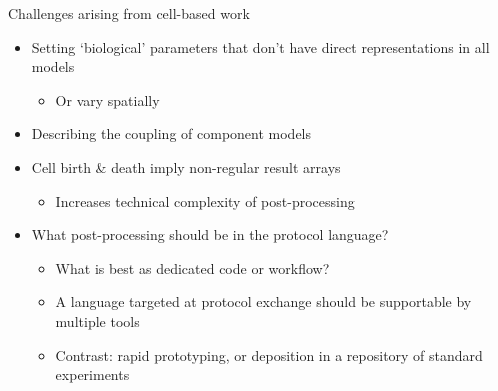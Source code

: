 \documentclass[t,xcolor={usenames,dvipsnames}]{beamer}
\newcommand{\subitem}[1]{\begin{itemize}[<.->]\item #1 \end{itemize}}
\begin{document}
\begin{frame}{Challenges arising from cell-based work}
\begin{itemize}
\item Setting `biological' parameters that don't have direct representations in all models
  \subitem{Or vary spatially}
\item Describing the coupling of component models
\item Cell birth \& death imply non-regular result arrays
  \subitem{Increases technical complexity of post-processing}
\item What post-processing should be in the protocol language?
  \begin{itemize}[<.->]
  \item What is best as dedicated code or workflow?
  \item A language targeted at protocol exchange should be supportable by multiple tools
  \item Contrast: rapid prototyping, or deposition in a repository of standard experiments
  \end{itemize}
\end{itemize}
\end{frame}
\end{document}
